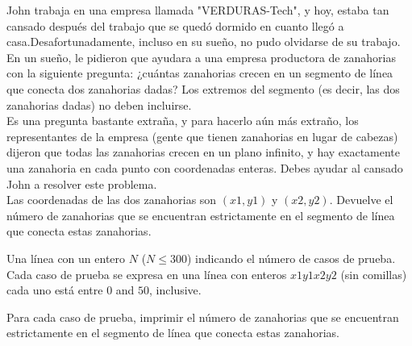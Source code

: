 
John trabaja en una empresa llamada "VERDURAS-Tech", y hoy, estaba tan cansado después del trabajo que se quedó dormido en cuanto llegó a casa.Desafortunadamente, incluso en su sueño, no pudo olvidarse de su trabajo. En un sueño, le pidieron que ayudara a una empresa productora de zanahorias con la siguiente pregunta: ¿cuántas zanahorias crecen en un segmento de línea que conecta dos zanahorias dadas? Los extremos del segmento (es decir, las dos zanahorias dadas) no deben incluirse.\\

Es una pregunta bastante extraña, y para hacerlo aún más extraño, los representantes de la empresa (gente que tienen zanahorias en lugar de cabezas) dijeron que todas las zanahorias crecen en un plano infinito, y hay exactamente una zanahoria en cada punto con coordenadas enteras. Debes ayudar al cansado John a resolver este problema.\\

Las coordenadas de las dos zanahorias son $(x1, y1)$ y $(x2, y2)$. Devuelve el número de zanahorias que se encuentran estrictamente en el segmento de línea que conecta estas zanahorias.


Una línea con un entero $N$ ($N \leq 300$) indicando el número de casos de prueba.
Cada caso de prueba se expresa en una línea con enteros $x1 y1 x2 y2$ (sin comillas) cada uno está entre $0$ and $50$, inclusive.

\outputText

Para cada caso de prueba, imprimir el número de zanahorias que se encuentran estrictamente en el segmento de línea que conecta estas zanahorias.
